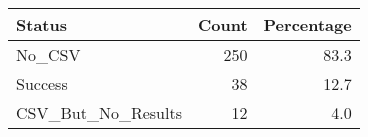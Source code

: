 \begin{tabular}{lrr}
\toprule
Status & Count & Percentage \\
\midrule
No_CSV & 250 & 83.3 \\
Success & 38 & 12.7 \\
CSV_But_No_Results & 12 & 4.0 \\
\bottomrule
\end{tabular}